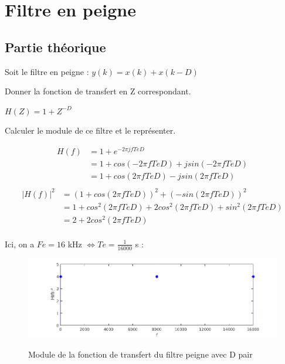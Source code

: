 
\section{Filtre en peigne}

\subsection{Partie théorique}

Soit le filtre en peigne : $y(k)= x(k)+ x(k − D)$

Donner la fonction de transfert en Z correspondant.

$H(Z) = 1 + Z^{-D}$

Calculer le module de ce filtre et le représenter.

\begin{align*}
  H(f) &= 1 + e^{-2\pi jfTeD}\\
       &= 1 + cos(-2\pi fTeD) + jsin(-2\pi fTeD)\\
       &= 1 + cos(2\pi fTeD) - jsin(2\pi fTeD)\\
\end{align*}
\begin{align*}
  |H(f)|^{2} &= (1 + cos(2\pi fTeD))^{2} + (-sin(2\pi fTeD))^{2}\\
             &= 1 + cos^{2}(2\pi fTeD) + 2cos^{2}(2\pi fTeD) + sin^{2}(2\pi fTeD)\\
             &= 2 + 2cos^{2}(2\pi fTeD)\\
\end{align*}


Ici, on a $Fe = 16$ kHz $\iff Te = \frac{1}{16000}$ s :

\begin{figure}[!ht]
		\begin{center}
			\includegraphics[width=1\textwidth]{img/modulePeigneDpair}
			\label{fig:modulePeigneDpair}
			\caption{Module de la fonction de transfert du filtre peigne avec D pair}
		\end{center}
\end{figure}

